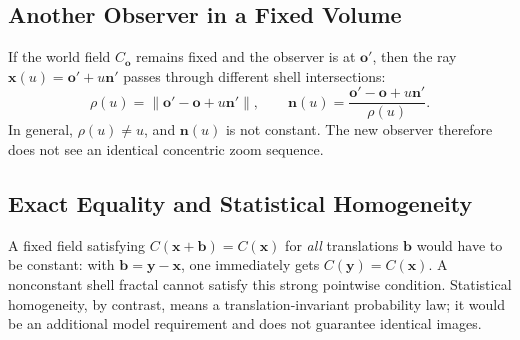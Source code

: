 \documentclass[11pt,a4paper]{article}
\numberwithin{equation}{section}
\newcommand{\vct}[1]{\boldsymbol{#1}}
\begin{document}
\begin{center}
\end{center}

\subsection{Another Observer in a Fixed Volume}
If the world field $C_{\vct o}$ remains fixed and the observer is at $\vct o'$,
then the ray $\vct x(u)=\vct o'+u\vct n'$ passes through different shell intersections:
\begin{equation}
 \rho(u)=\|\vct o'-\vct o+u\vct n'\|,\qquad
 \vct n(u)=\frac{\vct o'-\vct o+u\vct n'}{\rho(u)}.
\end{equation}
In general, $\rho(u)\ne u$, and $\vct n(u)$ is not constant.
The new observer therefore does not see an identical concentric zoom sequence.

\subsection{Exact Equality and Statistical Homogeneity}
A fixed field satisfying $C(\vct x+\vct b)=C(\vct x)$ for \emph{all} translations
$\vct b$ would have to be constant: with $\vct b=\vct y-\vct x$, one immediately gets
$C(\vct y)=C(\vct x)$. A nonconstant shell fractal cannot satisfy this strong pointwise
condition. Statistical homogeneity, by contrast, means a translation-invariant
probability law; it would be an additional model requirement and does not guarantee
identical images.
\end{document}
